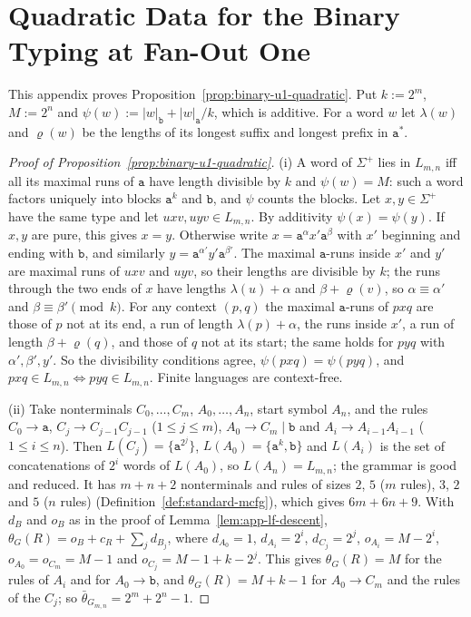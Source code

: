 \documentclass[11pt]{article}
\numberwithin{equation}{section}
\theoremstyle{plain}
\theoremstyle{definition}
\theoremstyle{remark}
\begin{document}
\section{Quadratic Data for the Binary Typing at Fan-Out One}
\label{app:binary-u1-quadratic}

This appendix proves Proposition~\ref{prop:binary-u1-quadratic}.  Put
$k:=2^m$, $M:=2^n$ and $\psi(w):=|w|_{\mathtt b}+|w|_{\mathtt a}/k$, which is
additive.  For a word $w$ let $\lambda(w)$ and $\varrho(w)$ be the lengths of its
longest suffix and longest prefix in $\mathtt a^*$.

\begin{proof}[Proof of Proposition~\ref{prop:binary-u1-quadratic}]
(i) A word of $\Sigma^+$ lies in $L_{m,n}$ iff all its maximal runs of $\mathtt a$
have length divisible by $k$ and $\psi(w)=M$: such a word factors uniquely into
blocks $\mathtt a^k$ and $\mathtt b$, and $\psi$ counts the blocks.  Let
$x,y\in\Sigma^+$ have the same type and let $uxv,uyv\in L_{m,n}$.  By additivity
$\psi(x)=\psi(y)$.  If $x,y$ are pure, this gives $x=y$.  Otherwise write
$x=\mathtt a^{\alpha}x'\mathtt a^{\beta}$ with $x'$ beginning and ending with
$\mathtt b$, and similarly $y=\mathtt a^{\alpha'}y'\mathtt a^{\beta'}$.  The maximal
$\mathtt a$-runs inside $x'$ and $y'$ are maximal runs of $uxv$ and $uyv$, so their
lengths are divisible by $k$; the runs through the two ends of $x$ have lengths
$\lambda(u)+\alpha$ and $\beta+\varrho(v)$, so $\alpha\equiv\alpha'$ and
$\beta\equiv\beta'\pmod k$.  For any context $(p,q)$ the maximal $\mathtt a$-runs of
$pxq$ are those of $p$ not at its end, a run of length $\lambda(p)+\alpha$, the
runs inside $x'$, a run of length $\beta+\varrho(q)$, and those of $q$ not at its
start; the same holds for $pyq$ with $\alpha',\beta',y'$.  So the divisibility
conditions agree, $\psi(pxq)=\psi(pyq)$, and $pxq\in L_{m,n}\iff pyq\in L_{m,n}$.
Finite languages are context-free.

(ii) Take nonterminals $C_0,\ldots,C_m$, $A_0,\ldots,A_n$, start symbol $A_n$, and the
rules $C_0\to\mathtt a$, $C_j\to C_{j-1}C_{j-1}$ ($1\le j\le m$),
$A_0\to C_m\mid\mathtt b$ and $A_i\to A_{i-1}A_{i-1}$ ($1\le i\le n$).  Then
$L(C_j)=\{\mathtt a^{2^j}\}$, $L(A_0)=\{\mathtt a^k,\mathtt b\}$ and $L(A_i)$ is the
set of concatenations of $2^i$ words of $L(A_0)$, so $L(A_n)=L_{m,n}$; the grammar
is good and reduced.  It has $m+n+2$ nonterminals and rules of sizes $2$, $5$
($m$ rules), $3$, $2$ and $5$ ($n$ rules) (Definition~\ref{def:standard-mcfg}),
which gives $6m+6n+9$.  With $d_B$ and $o_B$ as in the proof of
Lemma~\ref{lem:app-lf-descent}, $\theta_G(R)=o_B+c_R+\sum_jd_{B_j}$, where
$d_{A_0}=1$, $d_{A_i}=2^i$, $d_{C_j}=2^j$, $o_{A_i}=M-2^i$, $o_{A_0}=o_{C_m}=M-1$ and
$o_{C_j}=M-1+k-2^j$.  This gives $\theta_G(R)=M$ for the rules of $A_i$ and for
$A_0\to\mathtt b$, and $\theta_G(R)=M+k-1$ for $A_0\to C_m$ and the rules of the
$C_j$; so $\bar\theta_{G_{m,n}}=2^m+2^n-1$.


\end{proof}
\end{document}
